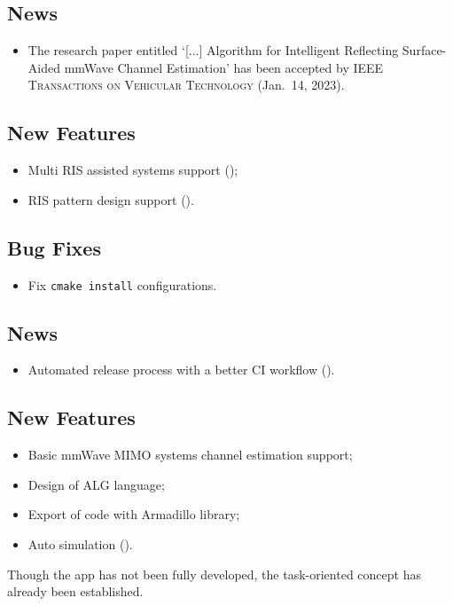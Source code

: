 \subsection*{News}
\begin{itemize}
  \item The research paper entitled `[...] Algorithm for Intelligent Reflecting Surface-Aided mmWave Channel Estimation' has been accepted by \textsc{IEEE Transactions on Vehicular Technology} (Jan.~14, 2023).
\end{itemize}

\subsection*{New Features}
\begin{itemize}
  \item Multi RIS assisted systems support ();
  \item RIS pattern design support ().
\end{itemize}
\subsection*{Bug Fixes}
\begin{itemize}
  \item Fix \texttt{cmake install} configurations.
\end{itemize}
\subsection*{News}
\begin{itemize}
  \item Automated release process with a better CI workflow ().
\end{itemize}

\subsection*{New Features}
\begin{itemize}
  \item Basic mmWave MIMO systems channel estimation support;
  \item Design of ALG language;
  \item Export of code with Armadillo library;
  \item Auto simulation ().
\end{itemize}

Though the app has not been fully developed,
the task-oriented concept has already been established.

